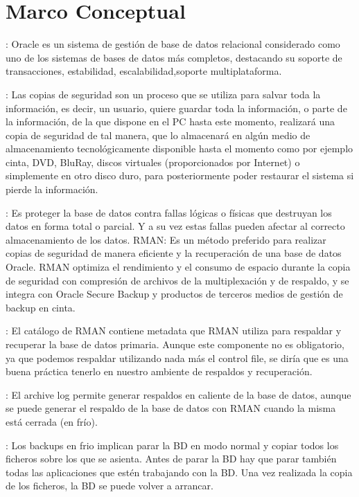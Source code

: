 \section{Marco Conceptual}
\textbf{}: Oracle es un sistema de gestión de base de datos relacional considerado como uno de los sistemas de bases de datos más completos, destacando su soporte de transacciones, estabilidad, escalabilidad,soporte multiplataforma.

\textbf{}: Las copias de seguridad son un proceso que se utiliza para salvar toda la información, es decir, un usuario, quiere guardar toda la información, o parte de la información, de la que dispone en el PC hasta este momento, realizará una copia de seguridad de tal manera, que lo almacenará en algún medio de almacenamiento tecnológicamente disponible hasta el momento como por ejemplo cinta, DVD, BluRay, discos virtuales (proporcionados por Internet) o simplemente en otro disco duro, para posteriormente poder restaurar el sistema si pierde la información.

\textbf{}: Es proteger la base de datos contra fallas lógicas o físicas que destruyan los datos en forma total o parcial. Y a su vez estas fallas pueden afectar al correcto almacenamiento de los datos.
RMAN: Es un método preferido para realizar copias de seguridad de manera eficiente y la recuperación de una base de datos Oracle. RMAN optimiza el rendimiento y el consumo de espacio durante la copia de seguridad con compresión de archivos de la multiplexación y de respaldo, y se integra con Oracle Secure Backup y productos de terceros medios de gestión de backup en cinta.

\textbf{}: El catálogo de RMAN contiene metadata que RMAN utiliza para respaldar y recuperar la base de datos primaria. Aunque este componente no es obligatorio, ya que podemos respaldar utilizando nada más el control file, se diría que es una buena práctica tenerlo en nuestro ambiente de respaldos y recuperación.

\textbf{}: El archive log permite generar respaldos en caliente de la base de datos, aunque se puede generar el respaldo de la base de datos con RMAN cuando la misma está cerrada (en frío).

\textbf{}: Los backups en frio implican parar la BD en modo normal y copiar todos los ficheros sobre los que se asienta. Antes de parar la BD hay que parar también todas las aplicaciones que estén trabajando con la BD. Una vez realizada la copia de los ficheros, la BD se puede volver a arrancar.

